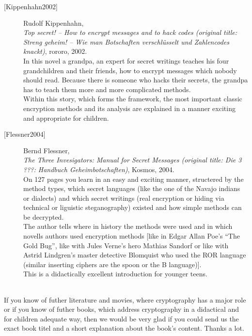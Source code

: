 \begin{description}
\item[\textrm{[Kippenhahn2002]}] 
    Rudolf Kippenhahn, \\
    {\em Top secret! -- How to encrypt messages and to hack codes (original
    title: Streng geheim! -- Wie man Botschaften verschl\"usselt und 
    Zahlencodes knackt)}, rororo, 2002. \\
    In this novel a grandpa, an expert for secret writings teaches his
    four grandchildren and their friends, how to encrypt messages which
    nobody should read. Because there is someone who hacks their secrets,
    the grandpa has to teach them more and more complicated methods. \\
    Within this story, which forms the framework, the most important classic
    encryption methods and its analysis are explained in a manner exciting
    and appropriate for children.\\


\item[\textrm{[Flessner2004]}] 
    Bernd Flessner, \\
    {\em The Three Invesigators: Manual for Secret Messages (original
    title: Die 3 ???: Handbuch Geheimbotschaften)},
    Kosmos, 2004. \\
    On 127 pages you learn in an easy and exciting manner, structered by
    the method types, which secret languages (like the one of the Navajo
    indians or dialects) and which secret writings (real encryption or
    hiding via technical or liguistic steganography) existed and how simple
    methods can be decrypted.\\
    The author tells where in history the methods were used and in which
    novells authors used encryption methods [like in Edgar Allan Poe's
    ``The Gold Bug'', like with Jules Verne's hero Mathias Sandorf or like
    with Astrid Lindgren's master detective Blomquist who used the ROR language
    (similar inserting ciphers are the spoon or the B language)].\\
    This is a didactically excellent introduction for younger teens.\\


\end{description}

\mbox{}\\

If you know of futher literature and movies, where cryptography has a major
role or if you know of futher books, which address cryptography in a
didactical and for children adequate way, then we would be very glad if
you could send us the exact book titel and a short explanation
about the book's content. Thanks a lot.


\clearpage
\listoffigures
{}


\clearpage

\listoftables
{}



